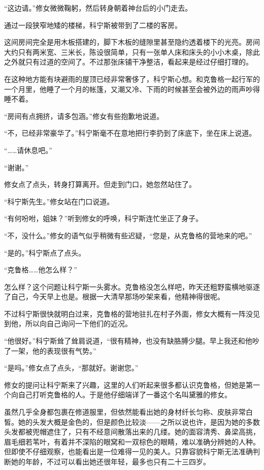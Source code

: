 “这边请。”修女微微鞠躬，然后转身朝着神台后的小门走去。

通过一段狭窄地矮的楼梯，科宁斯被带到了二楼的客房。

这间房间完全是用木板搭建的，脚下木板的缝隙里甚至隐约透着楼下的光亮。房间大约只有两米宽、三米长，陈设很简单，只有一张单人床和床头的小小木桌，除此之外就只有过道的空间了。不过那张床铺干净整洁，看起来是经过仔细打理的。

在这种地方能有块避雨的屋顶已经非常奢侈了，科宁斯心想。和克鲁格一起行军的一个月里，他睡了一个月的帐篷，又潮又冷、下雨的时候甚至会被外边的雨声吵得睡不着。

“房间有点拥挤，请多包涵。”修女有些抱歉地说道。

“不，已经非常豪华了。”科宁斯毫不在意地把行李扔到了床底下，坐在床上说道。

“……请休息吧。”

“谢谢。”

修女点了点头，转身打算离开。但走到门口，她忽然站住了。

“科宁斯先生。”修女站在门口说道。

“有何吩咐，姐妹？”听到修女的呼唤，科宁斯连忙坐正了身子。

“不，没什么。”修女的语气似乎稍微有些迟疑，“您是，从克鲁格的营地来的吧。”

“是的。”科宁斯点了点头。

“克鲁格……他怎么样？”

怎么样？这个问题让科宁斯一头雾水。克鲁格没怎么样吧，昨天还粗野蛮横地驱逐了自己，今天早上也是。根据一大清早那场吵架来看，他精神得很呢。

不过科宁斯很快就明白过来，克鲁格的营地驻扎在村子外面，修女大概有一阵没见到他，所以向自己询问一下他们的近况。

“他很好。”科宁斯耸了耸肩说道，“很有精神，也没有缺胳膊少腿。早上我还和他吵了一架，他的表现很有气势。”

“是吗。”修女点了点头，“那就好。谢谢您。”

修女的提问让科宁斯来了兴趣，这里的人们听起来很多都认识克鲁格，但她是第一个向自己打听克鲁格的人。于是他仔细端详了一番这个名叫黛雅的修女。

虽然几乎全身都包裹在修道服里，但依然能看出她的身材纤长匀称、皮肤非常白皙。她的头发大概是金色的，但是颜色比较淡——之所以说也许，是因为她的多数头发都被兜帽遮住了，只有不经意间散落出来的几缕。她的面容清秀、鼻梁高挑，眉毛细若苇叶，有着并不深陷的眼窝和一双棕色的眼睛，难以准确分辨她的人种。但即使不仔细观察，也能看出是一位难得一见的美人。只靠容貌科宁斯无法准确判断她的年龄，不过可以看出她还很年轻，最多也只有二十三四岁。

